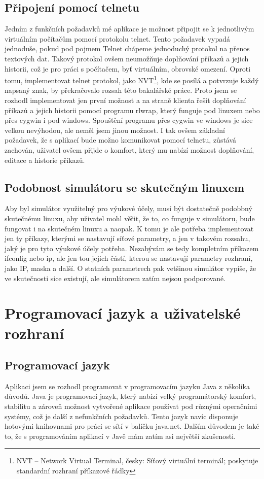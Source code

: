 \subsection{Připojení pomocí telnetu}

Jedním z funkčních požadavků mé aplikace je možnost připojit se k jednotlivým virtuálním počítačům pomocí protokolu telnet. Tento požadavek vypadá jednoduše, pokud pod pojmem Telnet chápeme jednoduchý protokol na přenos textových dat. Takový protokol ovšem neumožňuje doplňování příkazů a jejich historii, což je pro práci s počítačem, byť virtuálním, obrovské omezení. Oproti tomu, implementovat telnet protokol, jako NVT\footnote{NVT – Network Virtual Terminal, česky: Síťový virtuální terminál; poskytuje standardní rozhraní příkazové řádky}, kde se posílá a potvrzuje každý napsaný znak, by překračovalo rozsah této bakalářské práce. Proto jsem se rozhodl implementovat jen první možnost a na straně klienta řešit doplňování příkazů a jejich historii pomocí programu rlwrap, který funguje pod linuxem nebo přes cygwin i pod windows. Spouštění programu přes cygwin ve windows je sice velkou nevýhodou, ale neměl jsem jinou možnost. I tak ovšem základní požadavek, že s aplikací bude možno komunikovat pomocí telnetu, zůstává zachován, uživatel ovšem přijde o komfort, který mu nabízí možnost doplňování, editace a historie příkazů. 

\subsection{Podobnost simulátoru se skutečným linuxem}

Aby byl simulátor využitelný pro výukové účely, musí být dostatečně podobbný skutečnému linuxu, aby uživatel mohl věřit, že to, co funguje v simulátoru, bude fungovat i na skutečném linuxu a naopak. K tomu je ale potřeba implementovat jen ty příkazy, kterými se nastavují síťové parametry, a jen v takovém rozsahu, jaký je pro tyto výukové účely potřeba. Nezabývám se tedy kompletním příkazem ifconfig nebo ip, ale jen tou jejich částí, kterou se nastavují parametry rozhraní, jako IP, maska a další. O statních parametrech pak vetšinou simulátor vypíše, že ve skutečnosti sice existují, ale simulátorem zatím nejsou podporované.


\section{Programovací jazyk a uživatelské rozhraní}

\subsection{Programovací jazyk}
Aplikaci jsem se rozhodl programovat v programovacím jazyku Java z několika důvodů. Java je programovací jazyk, který nabízí velký programátorský komfort, stabilitu a zároveň možnost vytvořené aplikace používat pod různými operačními systémy, což je další z nefunkčních požadavků. Tento jazyk navíc disponuje hotovými knihovnami pro práci se sítí v balíčku java.net. Dalším důvodem je také to, že s programováním aplikací v Javě mám zatím asi největší zkušenosti.

